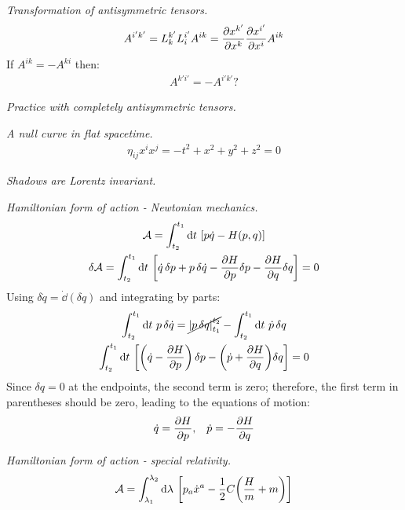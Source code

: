 \documentclass{report}
\begin{document}
\begin{subquests}
	\item \emph{Transformation of antisymmetric tensors.}
	\begin{gather*}
		A^{i'k'} = L^{k'}_k L^{i'}_i A^{ik} = \pdv{x^{k'}}{x^k}\pdv{x^{i'}}{x^i}A^{ik}
	\end{gather*}
	If $A^{ik} = -A^{ki}$ then:
	\begin{gather*}
		A^{k'i'} = - A^{i'k'} ?
	\end{gather*}

	\item \emph{Practice with completely antisymmetric tensors.}

	\item \emph{A null curve in flat spacetime.}
	\begin{gather*}
		\eta_{ij}x^{i}x^{j} = -t^2 + x^2 + y^2 + z^2 = 0 
	\end{gather*}

	\item \emph{Shadows are Lorentz invariant.}

	\item \emph{Hamiltonian form of action - Newtonian mechanics.}
	\begin{gather*}
		\mathcal A = \int_{t_2}^{t_1}\dd{t}\,\bqty{p\dot q - H(p,q)} \\
		\delta\mathcal A = \int_{t_2}^{t_1} \dd{t}\, \bqty{\dot q\,\delta p + p\,\delta\dot q  - \pdv{H}{p}\delta p - \pdv{H}{q}\delta q} = 0
	\end{gather*}
	Using $\delta\dot q = \dot\dd(\delta q)$ and integrating by parts:
	\begin{gather*}
		\int_{t_2}^{t_1} \dd{t}\, p\,\delta \dot q = \cancel{\left|p\,\delta q\right|_{t_1}^{t_2}} - \int_{t_2}^{t_1} \dd{t}\,\dot p\, \delta q  \\
		\int_{t_2}^{t_1} \dd{t}\, \bqty{\pqty{\dot q -\pdv{H}{p}}\,\delta p - \pqty{\dot p + \pdv{H}{q}}\delta q} = 0
	\end{gather*}
	Since $\delta q = 0 $ at the endpoints, the second term is zero; therefore, the first term in parentheses should be zero, leading to the equations of motion:
	\begin{gather*}
		\dot q = \pdv{H}{p},\;\;\;\dot p = -\pdv{H}{q} 	
	\end{gather*} 
	
	\item \emph{Hamiltonian form of action - special relativity.}
	\begin{gather*}
		\mathcal A = \int_{\lambda_1}^{\lambda_2} \dd{\lambda}\, \bqty{p_a \dot x^a - \frac{1}{2}C\pqty{\frac{H}{m} + m}}		
	\end{gather*}


\end{subquests}
\end{document}
